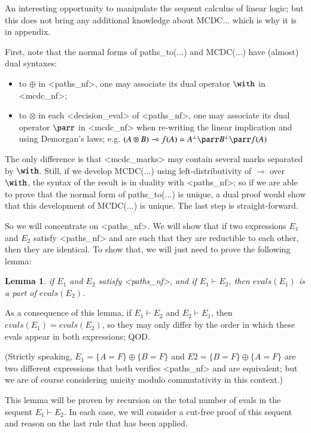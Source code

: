 \documentclass[a4paper,12pt,twoside]{article}
\newtheorem{lemma}{Lemma}[subsection]
\begin{document}
An interesting opportunity to manipulate the sequent calculus of
linear logic; but this does not bring any additional knowledge about
MCDC... which is why it is in appendix.

First, note that the normal forms of paths\_to(...) and MCDC(...)
have (almost) dual syntaxes:
\begin{itemize}
\item to $\oplus$ in <paths\_nf>, one may associate its dual operator $\with$
  in <mcdc\_nf>;
\item to $\otimes$ in each <decision\_eval> of <paths\_nf>, one may associate
  its dual operator $\parr$ in <mcdc\_nf> when re-writing the linear
  implication and using Demorgan's laws; e.g.
   $(A \otimes B) \multimap f(A) = A^\bot \parr B^\bot \parr f(A)$
\end{itemize}

The only difference is that <mcdc\_marks> may contain several marks
separated by $\with$. Still, if we develop MCDC(...) using
left-distributivity of $\multimap$ over $\with$, the syntax of the
result is in duality with <paths\_nf>; so if we are able to prove that
the normal form of paths\_to(...) is unique, a dual proof would show
that this development of MCDC(...) is unique. The last step is
straight-forward.

So we will concentrate on <paths\_nf>. We will show that if two
expressions $E_1$ and $E_2$ satisfy <paths\_nf> and are such that they
are reductible to each other, then they are identical. To show that,
we will just need to prove the following lemma:

\begin{lemma}
  \label{lemma:evals-in-paths-nf}
 if $E_1$ and $E_2$ satisfy <paths\_nf>, and if $E_1 \vdash E_2$,
 then $evals(E_1)$ is a part of $evals(E_2)$.
\end{lemma}

As a consequence of this lemma, if $E_1 \vdash E_2$ and $E_2 \vdash E_1$,
then $evals(E_1) = evals(E_2)$, so they may only differ by the order in
which these evals appear in both expressions; QOD.

(Strictly speaking, $E_1 = \{A=F\} \oplus \{B=F\}$ and $E2 = \{B=F\} \oplus
\{A=F\}$ are two different expressions that both verifies <paths\_nf>
and are equivalent; but we are of course considering unicity modulo
commutativity in this context.)

This lemma will be proven by recursion on the total number of evals in
the sequent $E_1 \vdash E_2$. In each case, we will consider a cut-free
proof of this sequent and reason on the last rule that has been
applied.
\end{document}
